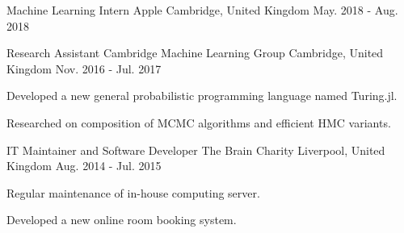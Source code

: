 

\begin{cventries}

  \cventry
    {Machine Learning Intern} %
    {Apple} %
    {Cambridge, United Kingdom} %
    {May. 2018 - Aug. 2018} %
    {
    }

  \cventry
    {Research Assistant} %
    {Cambridge Machine Learning Group} %
    {Cambridge, United Kingdom} %
    {Nov. 2016 - Jul. 2017} %
    {
      \begin{cvitems} %
        \item {Developed a new general probabilistic programming language named Turing.jl.}
        \item {Researched on composition of MCMC algorithms and efficient HMC variants.}
      \end{cvitems}
    }

  \cventry
    {IT Maintainer and Software Developer} %
    {The Brain Charity} %
    {Liverpool, United Kingdom} %
    {Aug. 2014 - Jul. 2015} %
    {
      \begin{cvitems} %
        \item {Regular maintenance of in-house computing server.}
        \item {Developed a new online room booking system.}
      \end{cvitems}
    }

\end{cventries}
